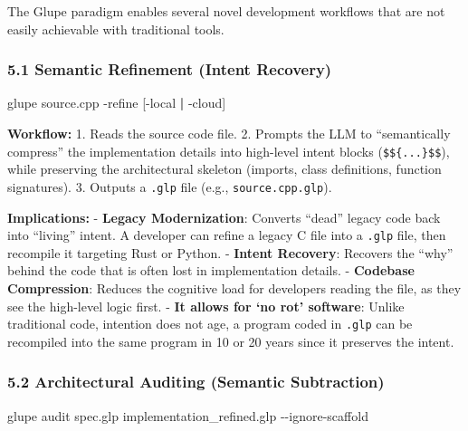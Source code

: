 \documentclass[11pt, a4paper]{article}
\newenvironment{Shaded}{\begin{snugshade}}{\end{snugshade}}
\newcommand{\AttributeTok}[1]{\textcolor[rgb]{0.77,0.63,0.00}{#1}}
\newcommand{\ExtensionTok}[1]{#1}
\newcommand{\KeywordTok}[1]{\textcolor[rgb]{0.13,0.29,0.53}{\textbf{#1}}}
\newcommand{\NormalTok}[1]{#1}
\begin{document}
The Glupe paradigm enables several novel development workflows that are
not easily achievable with traditional tools.

\subsubsection{5.1 Semantic Refinement (Intent
Recovery)}\label{semantic-refinement-intent-recovery}

\begin{Shaded}
\begin{Highlighting}[]
\ExtensionTok{glupe}\NormalTok{ source.cpp }\AttributeTok{{-}refine}\NormalTok{ [{-}local }\KeywordTok{|} \ExtensionTok{{-}cloud]}
\end{Highlighting}
\end{Shaded}

\textbf{Workflow:} 1. Reads the source code file. 2. Prompts the LLM to
``semantically compress'' the implementation details into high-level
intent blocks (\texttt{\$\$\{...\}\$\$}), while preserving the
architectural skeleton (imports, class definitions, function
signatures). 3. Outputs a \texttt{.glp} file (e.g.,
\texttt{source.cpp.glp}).

\textbf{Implications:} - \textbf{Legacy Modernization}: Converts
``dead'' legacy code back into ``living'' intent. A developer can refine
a legacy C file into a \texttt{.glp} file, then recompile it targeting
Rust or Python. - \textbf{Intent Recovery}: Recovers the ``why'' behind
the code that is often lost in implementation details. -
\textbf{Codebase Compression}: Reduces the cognitive load for developers
reading the file, as they see the high-level logic first. - \textbf{It
allows for `no rot' software}: Unlike traditional code, intention does
not age, a program coded in \texttt{.glp} can be recompiled into the
same program in 10 or 20 years since it preserves the intent.

\subsubsection{5.2 Architectural Auditing (Semantic
Subtraction)}\label{architectural-auditing-semantic-subtraction}

\begin{Shaded}
\begin{Highlighting}[]
\ExtensionTok{glupe}\NormalTok{ audit spec.glp implementation\_refined.glp }\AttributeTok{{-}{-}ignore{-}scaffold}
\end{Highlighting}
\end{Shaded}
\end{document}
